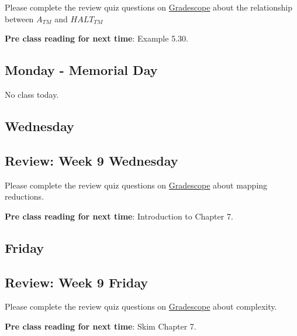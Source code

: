 Please complete the review quiz questions on \href{http://gradescope.com}{Gradescope} about 
the relationship between $A_{TM}$ and $HALT_{TM}$

{\bf Pre class reading for next time}: Example 5.30.

\newpage

\subsection*{Monday - Memorial Day}
No class today.

\subsection*{Wednesday}

%
    


\subsection*{Review: Week 9 Wednesday}

Please complete the review quiz questions on \href{http://gradescope.com}{Gradescope} about 
mapping reductions.

{\bf Pre class reading for next time}: Introduction to Chapter 7.



\newpage
\subsection*{Friday}



\newpage
\subsection*{Review: Week 9 Friday}


Please complete the review quiz questions on \href{http://gradescope.com}{Gradescope} about 
complexity.

{\bf Pre class reading for next time}: Skim Chapter 7.

\newpage
